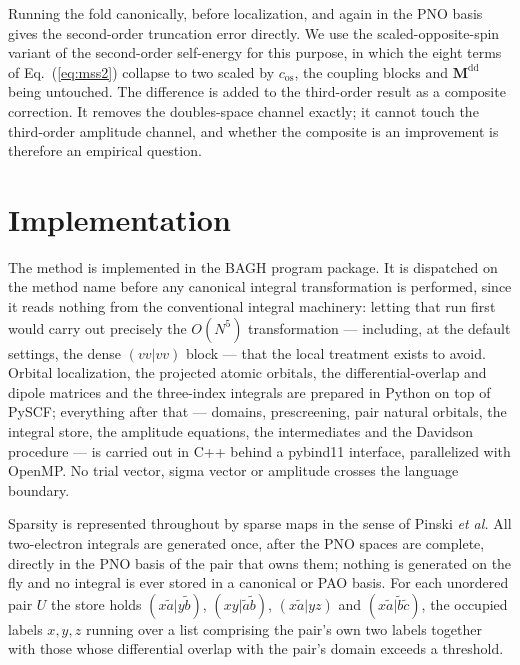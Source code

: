 \documentclass[aip,jcp,amsmath,amssymb,preprint,superscriptaddress]{revtex4-2}%
\newcommand{\pao}[1]{\tilde{#1}}
\newcommand{\Mdd}{\mathbf{M}^{\text{dd}}}
\begin{document}
Running the fold canonically, before localization, and again in the PNO basis
gives the second-order truncation error directly. We use the
scaled-opposite-spin variant of the second-order self-energy for this purpose,
in which the eight terms of Eq.~(\ref{eq:mss2}) collapse to two scaled by
$c_{\text{os}}$, the coupling blocks and $\Mdd$ being untouched. The
difference is added to the third-order result as a composite correction. It
removes the doubles-space channel exactly; it cannot touch the third-order
amplitude channel, and whether the composite is an improvement is therefore an
empirical question.

\section{Implementation}
\label{sec:implementation}

The method is implemented in the BAGH program package. It is dispatched on the
method name before any canonical integral transformation is performed, since
it reads nothing from the conventional integral machinery: letting that run
first would carry out precisely the $O(N^5)$ transformation --- including, at
the default settings, the dense $(vv|vv)$ block --- that the local treatment
exists to avoid. Orbital localization,
the projected atomic orbitals, the differential-overlap and dipole matrices
and the three-index integrals are prepared in Python on top of
PySCF;\cite{Sun2018} everything after that --- domains, prescreening, pair
natural orbitals, the integral store, the amplitude equations, the
intermediates and the Davidson procedure --- is carried out in C++ behind a
pybind11 interface, parallelized with OpenMP. No trial vector, sigma vector or
amplitude crosses the language boundary.

Sparsity is represented throughout by sparse maps in the sense of Pinski
\emph{et al.}\cite{Pinski2015} All two-electron integrals are generated once,
after the PNO spaces are complete, directly in the PNO basis of the pair that
owns them; nothing is generated on the fly and no integral is ever stored in a
canonical or PAO basis. For each unordered pair $U$ the store holds
$(x\pao{a}|y\pao{b})$, $(xy|\pao{a}\pao{b})$, $(x\pao{a}|yz)$ and
$(x\pao{a}|\pao{b}\pao{c})$, the occupied labels $x,y,z$ running over a list
comprising the pair's own two labels together with those whose differential
overlap with the pair's domain exceeds a threshold.
\end{document}
